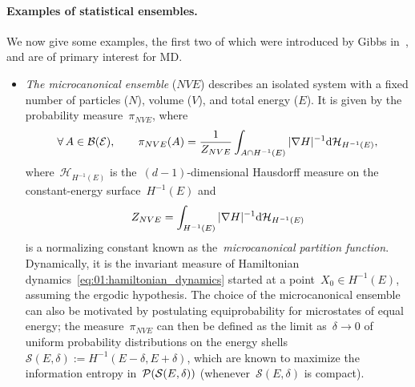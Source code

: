 \paragraph{Examples of statistical ensembles.}
We now give some examples, the first two of which were introduced by Gibbs in~\cite{G02}, and are of primary interest for MD.
\begin{itemize}
    \item{\textit{The microcanonical ensemble} ($NVE$) describes an isolated system with a fixed number of particles ($N$), volume ($V$), and total energy ($E$). It is given by the probability measure~$\pi_{NVE}$, where
    \begin{equation}
        \label{eq:01:microcanonical_distribution}
        \forall\,A\in\mathcal B(\mathcal{E}),\qquad \pi_{NVE}(A) = \frac1{Z_{NVE}}\int_{A\cap H^{-1}(E)}|\nabla H|^{-1}\mathrm{d}\mathcal{H}_{H^{-1}(E)},
    \end{equation}
    where~$\mathcal{H}_{H^{-1}(E)}$ is the~$(d-1)$-dimensional Hausdorff measure on the constant-energy surface~$H^{-1}(E)$ and
    \[Z_{NVE}=\int_{H^{-1}(E)}|\nabla H|^{-1}\mathrm{d}\mathcal{H}_{H^{-1}(E)}\]
    is a normalizing constant known as the~\textit{microcanonical partition function}. Dynamically, it is the invariant measure of Hamiltonian dynamics~\eqref{eq:01:hamiltonian_dynamics} started at a point~$X_0\in H^{-1}(E)$, assuming the ergodic hypothesis.
    The choice of the microcanonical ensemble can also be motivated by postulating equiprobability for microstates of equal energy; the measure~$\pi_{NVE}$ can then be defined as the limit as~$\delta\to 0$ of uniform probability distributions on the energy shells~$\mathcal S(E,\delta):=H^{-1}(E-\delta,E+\delta)$, which are known to maximize the information entropy in~$\mathcal{P}(\mathcal S(E,\delta))$ (whenever~$\mathcal S(E,\delta)$ is compact).}


\end{itemize}
